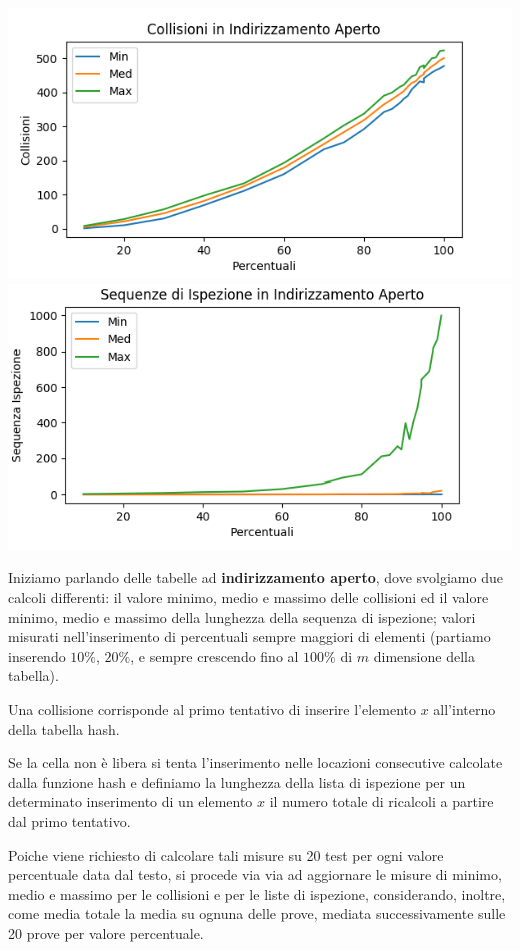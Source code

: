 \documentclass{article}
\begin{document}
\begin{center}
    \includegraphics[scale=0.8]{IA_Coll.png}
    \includegraphics[scale=0.8]{IA_LenI.png}
\end{center}




Iniziamo parlando delle tabelle ad \textbf{indirizzamento aperto}, dove svolgiamo due calcoli differenti: il valore minimo, medio e massimo delle collisioni ed il valore minimo, medio e massimo della lunghezza della sequenza di ispezione; valori misurati nell'inserimento di percentuali sempre maggiori di elementi (partiamo inserendo $10\%$, $20\%$, e sempre crescendo fino al $100\%$ di $m$ dimensione della tabella).

Una collisione corrisponde al primo tentativo di inserire l'elemento $x$ all'interno della tabella hash. 

Se la cella non è libera si tenta l'inserimento nelle locazioni consecutive calcolate dalla funzione hash e definiamo la lunghezza della lista di ispezione per un determinato inserimento di un elemento $x$ il numero totale di ricalcoli a partire dal primo tentativo.

Poiche viene richiesto di calcolare tali misure su 20 test per ogni valore percentuale data dal testo, si procede via via ad aggiornare le misure di minimo, medio e massimo per le collisioni e per le liste di ispezione, considerando, inoltre, come media totale la media su ognuna delle prove, mediata successivamente sulle 20 prove per valore percentuale.
\end{document}
